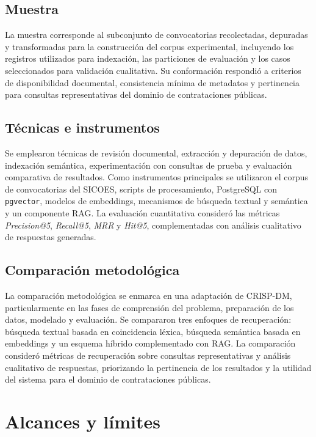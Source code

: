 \subsection{Muestra}

La muestra corresponde al subconjunto de convocatorias recolectadas, depuradas y transformadas para la construcción del corpus experimental, incluyendo los registros utilizados para indexación, las particiones de evaluación y los casos seleccionados para validación cualitativa. Su conformación respondió a criterios de disponibilidad documental, consistencia mínima de metadatos y pertinencia para consultas representativas del dominio de contrataciones públicas.

\subsection{Técnicas e instrumentos}

Se emplearon técnicas de revisión documental, extracción y depuración de datos, indexación semántica, experimentación con consultas de prueba y evaluación comparativa de resultados. Como instrumentos principales se utilizaron el corpus de convocatorias del SICOES, scripts de procesamiento, PostgreSQL con \texttt{pgvector}, modelos de embeddings, mecanismos de búsqueda textual y semántica y un componente RAG. La evaluación cuantitativa consideró las métricas \textit{Precision@5}, \textit{Recall@5}, \textit{MRR} y \textit{Hit@5}, complementadas con análisis cualitativo de respuestas generadas.

\subsection{Comparación metodológica}

La comparación metodológica se enmarca en una adaptación de CRISP-DM, particularmente en las fases de comprensión del problema, preparación de los datos, modelado y evaluación. Se compararon tres enfoques de recuperación: búsqueda textual basada en coincidencia léxica, búsqueda semántica basada en embeddings y un esquema híbrido complementado con RAG. La comparación consideró métricas de recuperación sobre consultas representativas y análisis cualitativo de respuestas, priorizando la pertinencia de los resultados y la utilidad del sistema para el dominio de contrataciones públicas.

\section{Alcances y límites}

